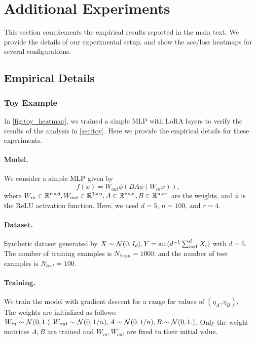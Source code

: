 \section{Additional Experiments}\label{app:add_exps}
This section complements the empirical results reported in the main text. We provide the details of our experimental setup, and show the acc/loss heatmaps for several configurations.
\subsection{Empirical Details}
\subsubsection{Toy Example}
In \cref{fig:toy_heatmap}, we trained a simple MLP with LoRA layers to verify the results of the analysis in \cref{sec:toy}. Here we provide the empirical details for these experiments.

\paragraph{Model.} We consider a simple MLP given by
\begin{equation*}
f(x) = W_{out} \phi(BA \phi(W_{in} x)),
\end{equation*}
where $W_{in} \in \mathbb{R}^{n\times d}, W_{out} \in \mathbb{R}^{1\times n}, A \in \mathbb{R}^{r\times n}, B \in \mathbb{R}^{n \times r}$ are the weights, and $\phi$ is the ReLU activation function. Here, we used $d=5$, $n=100$, and $r=4$.

\paragraph{Dataset.} Synthetic dataset generated by $X\sim \mathcal{N}(0, I_d), Y = \sin(d^{-1}\sum_{i=1}^d X_i)$ with $d=5$. The number of training examples is $N_{train}=1000$, and the number of test examples is $N_{test}=100$.

\paragraph{Training.} We train the model with gradient descent for a range for values of $(\eta_A,\eta_B)$. The weights are initialized as follows: $W_{in} \sim \mathcal{N}(0,1.), W_{out} \sim \mathcal{N}(0, 1/n), A \sim \mathcal{N}(0, 1/n), B \sim \mathcal{N}(0, 1.)$. Only the weight matrices $A, B$ are trained and $W_{in}, W_{out}$ are fixed to their initial value. 



